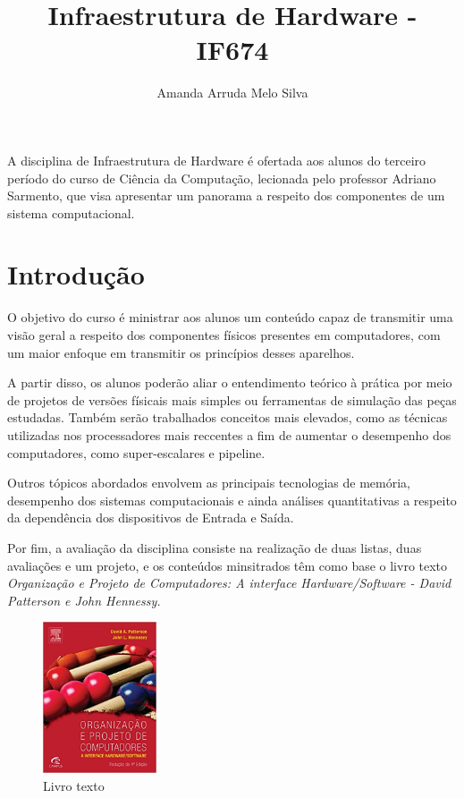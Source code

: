 \documentclass[12pt]{article}
\title{Infraestrutura de Hardware - IF674}
\author{Amanda Arruda Melo Silva\inst{1}}
\begin{document}
 
	
	\maketitle
	
	\begin{resumo} 
	    A disciplina de Infraestrutura de Hardware é ofertada aos alunos do terceiro período do curso de Ciência da Computação, lecionada pelo professor Adriano Sarmento, que visa apresentar um panorama a respeito dos componentes de um sistema computacional.

	\end{resumo}
	
	\section{Introdução}
	\label{sec:introducao}
	
        O objetivo do curso é ministrar aos alunos um conteúdo capaz de transmitir uma visão geral a respeito dos componentes físicos presentes em computadores, com um maior enfoque em transmitir os princípios desses aparelhos.
    	
    	A partir disso, os alunos poderão aliar o entendimento teórico à prática por meio de projetos de versões físicais mais simples ou ferramentas de simulação das peças estudadas. Também serão trabalhados conceitos mais elevados, como as técnicas utilizadas nos processadores mais reccentes a fim de aumentar o desempenho dos computadores, como super-escalares e pipeline.
    	
    	Outros tópicos abordados envolvem as principais tecnologias de memória, desempenho dos sistemas computacionais e ainda análises quantitativas a respeito da dependência dos dispositivos de Entrada e Saída.
    	
    	Por fim, a avaliação da disciplina consiste na realização de duas listas, duas avaliações e um projeto, e os conteúdos minsitrados têm como base o livro texto \emph{Organização e Projeto de Computadores: A interface Hardware/Software - David Patterson e John Hennessy.}
    	
        \begin{figure}[!h]
         \centering
         \includegraphics[width=0.3\textwidth]{figures/livro.jpg}
         \caption{Livro texto \citep{CInWiki}}
         \label{fig:livro}
        \end{figure}
\end{document}
